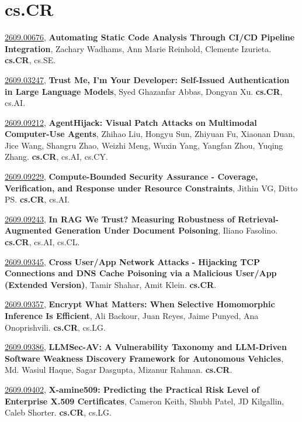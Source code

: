 \documentclass[9pt, a4paper]{article}
\theoremstyle{plain}
\theoremstyle{definition}
\theoremstyle{remark}
\newcommand{\arxivwithtarget}[3]{\hypertarget{#1}{}\href{https://arxiv.org/abs/#1}{#1}, \textbf{\textcolor{arxivblue}{#2}}, #3. }
\begin{document}
\section{cs.CR}
\arxivwithtarget{2609.00676}{Automating Static Code Analysis Through CI/CD Pipeline Integration}{Zachary Wadhams, Ann Marie Reinhold, Clemente Izurieta}\textbf{cs.CR}, cs.SE.



\arxivwithtarget{2609.03247}{Trust Me, I'm Your Developer: Self-Issued Authentication in Large Language Models}{Syed Ghazanfar Abbas, Dongyan Xu}\textbf{cs.CR}, cs.AI.



\arxivwithtarget{2609.09212}{AgentHijack: Visual Patch Attacks on Multimodal Computer-Use Agents}{Zhihao Liu, Hongyu Sun, Zhiyuan Fu, Xiaonan Duan, Jice Wang, Shangru Zhao, Weizhi Meng, Wuxin Yang, Yangfan Zhou, Yuqing Zhang}\textbf{cs.CR}, cs.AI, cs.CY.



\arxivwithtarget{2609.09229}{Compute-Bounded Security Assurance - Coverage, Verification, and Response under Resource Constraints}{Jithin VG, Ditto PS}\textbf{cs.CR}, cs.AI.



\arxivwithtarget{2609.09243}{In RAG We Trust? Measuring Robustness of Retrieval-Augmented Generation Under Document Poisoning}{Iliano Fasolino}\textbf{cs.CR}, cs.AI, cs.CL.



\arxivwithtarget{2609.09345}{Cross User/App Network Attacks - Hijacking TCP Connections and DNS Cache Poisoning via a Malicious User/App (Extended Version)}{Tamir Shahar, Amit Klein}\textbf{cs.CR}.



\arxivwithtarget{2609.09357}{Encrypt What Matters: When Selective Homomorphic Inference Is Efficient}{Ali Backour, Juan Reyes, Jaime Punyed, Ana Onoprishvili}\textbf{cs.CR}, cs.LG.



\arxivwithtarget{2609.09386}{LLMSec-AV: A Vulnerability Taxonomy and LLM-Driven Software Weakness Discovery Framework for Autonomous Vehicles}{Md. Wasiul Haque, Sagar Dasgupta, Mizanur Rahman}\textbf{cs.CR}.



\arxivwithtarget{2609.09402}{X-amine509: Predicting the Practical Risk Level of Enterprise X.509 Certificates}{Cameron Keith, Shubh Patel, JD Kilgallin, Caleb Shorter}\textbf{cs.CR}, cs.LG.
\end{document}
